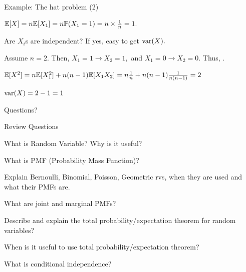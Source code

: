\begin{frame}{Example: The hat problem (2)}

\plitemsep 0.1in
\bci 
\item<1-> $\mathbb{E}[ X ] = n \mathbb{E}[ X_1 ] = n \mathbb{P}( X_1 =1 ) = n\times \frac{1}{n} = 1.$ 

\item<2->  Are $X_i$s are independent? If yes, easy to get $\text{var}( X ).$

\item<3-> Assume $n=2.$ Then, $X_1=1 \rightarrow X_2=1,$ and $X_1=0 \rightarrow X_2=0.$ Thus, .

\item<7-> $\mathbb{E}[ X^2 ] = n \mathbb{E}[ X_1^2 ] + n(n-1) \mathbb{E}[ X_1 X_2 ] = n\frac{1}{n} + n(n-1)\frac{1}{n(n-1)} = 2$

\item<8-> $\text{var}( X ) = 2-1 =1$ 
\eci
\end{frame}


\begin{frame}{}
\vspace{2cm}
\LARGE Questions?

\end{frame}

\begin{frame}{Review Questions}

\bce[1)]
\item What is Random Variable? Why is it useful?

\item What is PMF (Probability Mass Function)?

\item Explain Bernoulli, Binomial, Poisson, Geometric rvs, when they are used and what their PMFs are. 

\item What are joint and marginal PMFs?

\item Describe and explain the total probability/expectation theorem for random variables?

\item When is it useful to use total probability/expectation theorem?

\item What is conditional independence? 
\ece
\end{frame}





